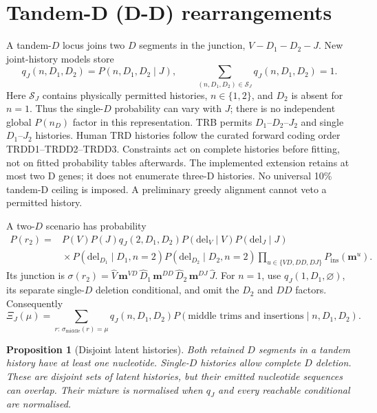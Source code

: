\documentclass[11pt]{article}
\theoremstyle{oldplain}
\newtheorem{proposition}{Proposition}
\theoremstyle{oldrem}
\newcommand{\ins}{\mathrm{ins}}
\newcommand{\del}{\mathrm{del}}
\begin{document}
\section{Tandem-D (D-D) rearrangements}\label{sec:dd}

A tandem-$D$ locus joins two $D$ segments in the junction,
$V\!-\!D_1\!-\!D_2\!-\!J$. New joint-history models store
\begin{equation}\label{eq:dhistory}
 q_J(n,D_1,D_2)=P(n,D_1,D_2\mid J),\qquad
 \sum_{(n,D_1,D_2)\in\mathcal S_J}q_J(n,D_1,D_2)=1.
\end{equation}
Here $\mathcal S_J$ contains physically permitted histories, $n\in\{1,2\}$,
and $D_2$ is absent for $n=1$. Thus the single-$D$ probability can vary with $J$;
there is no independent global $P(n_D)$ factor in this representation.
TRB permits $D_1$--$D_2$--$J_2$ and single $D_1$--$J_2$ histories.
Human TRD histories follow the curated forward coding order
TRDD1--TRDD2--TRDD3. Constraints act on complete histories before fitting,
not on fitted probability tables afterwards.
The implemented extension retains at most two D genes; it does not enumerate
three-D histories. No universal 10\% tandem-D ceiling is imposed.
A preliminary greedy alignment cannot veto a permitted history.

A two-$D$ scenario has probability
\begin{equation}\label{eq:pdd}
 \begin{aligned}
 P(r_2)={}&P(V)P(J)q_J(2,D_1,D_2)P(\del_V\mid V)P(\del_J\mid J)\\
 &{}\times P(\del_{D_1}\mid D_1,n=2)P(\del_{D_2}\mid D_2,n=2)
 \prod_{u\in\{VD,DD,DJ\}}P_{\ins}(\mathbf m^u).
 \end{aligned}
\end{equation}
Its junction is $\sigma(r_2)=\hat V\,\mathbf m^{VD}\,\hat D_1\,
\mathbf m^{DD}\,\hat D_2\,\mathbf m^{DJ}\,\hat J$.
For $n=1$, use $q_J(1,D_1,\varnothing)$, its separate single-$D$ deletion
conditional, and omit the $D_2$ and $DD$ factors. Consequently
\begin{equation}\label{eq:ximix}
 \Xi_J(\mu)=\sum_{r:\,\sigma_{\mathrm{middle}}(r)=\mu}
 q_J(n,D_1,D_2)P(\text{middle trims and insertions}\mid n,D_1,D_2).
\end{equation}

\begin{proposition}[Disjoint latent histories]\label{prop:dd}
Both retained $D$ segments in a tandem history have at least one nucleotide.
Single-$D$ histories allow complete $D$ deletion. These are disjoint sets of
latent histories, but their emitted nucleotide sequences can overlap.
Their mixture is normalised when $q_J$ and every reachable conditional are normalised.
\end{proposition}
\end{document}
